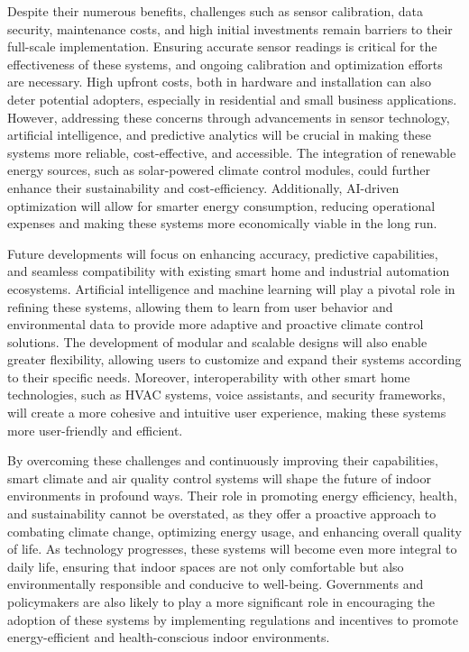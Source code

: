 \documentclass[a4paper]{scrartcl}
\begin{document}
Despite their numerous benefits, challenges such as sensor calibration, data security, maintenance costs, and high initial investments remain barriers to their full-scale implementation. Ensuring accurate sensor readings is critical for the effectiveness of these systems, and ongoing calibration and optimization efforts are necessary. High upfront costs, both in hardware and installation can also deter potential adopters, especially in residential and small business applications. However, addressing these concerns through advancements in sensor technology, artificial intelligence, and predictive analytics will be crucial in making these systems more reliable, cost-effective, and accessible. The integration of renewable energy sources, such as solar-powered climate control modules, could further enhance their sustainability and cost-efficiency. Additionally, AI-driven optimization will allow for smarter energy consumption, reducing operational expenses and making these systems more economically viable in the long run.

Future developments will focus on enhancing accuracy, predictive capabilities, and seamless compatibility with existing smart home and industrial automation ecosystems. Artificial intelligence and machine learning will play a pivotal role in refining these systems, allowing them to learn from user behavior and environmental data to provide more adaptive and proactive climate control solutions. The development of modular and scalable designs will also enable greater flexibility, allowing users to customize and expand their systems according to their specific needs. Moreover, interoperability with other smart home technologies, such as HVAC systems, voice assistants, and security frameworks, will create a more cohesive and intuitive user experience, making these systems more user-friendly and efficient.

By overcoming these challenges and continuously improving their capabilities, smart climate and air quality control systems will shape the future of indoor environments in profound ways. Their role in promoting energy efficiency, health, and sustainability cannot be overstated, as they offer a proactive approach to combating climate change, optimizing energy usage, and enhancing overall quality of life. As technology progresses, these systems will become even more integral to daily life, ensuring that indoor spaces are not only comfortable but also environmentally responsible and conducive to well-being. Governments and policymakers are also likely to play a more significant role in encouraging the adoption of these systems by implementing regulations and incentives to promote energy-efficient and health-conscious indoor environments.
\end{document}
